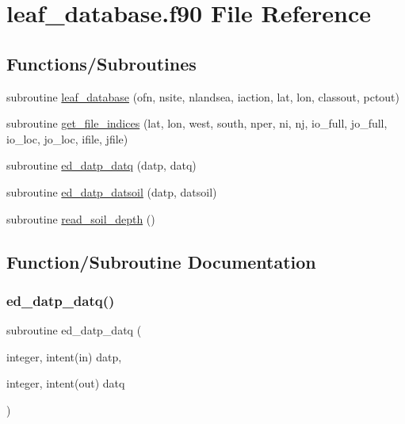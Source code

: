 \hypertarget{leaf__database_8f90}{}\section{leaf\+\_\+database.\+f90 File Reference}
\label{leaf__database_8f90}
\subsection*{Functions/\+Subroutines}
\begin{DoxyCompactItemize}
\item 
subroutine \hyperlink{leaf__database_8f90_a5009d489b8b1c0d281ea517731499fb9}{leaf\+\_\+database} (ofn, nsite, nlandsea, iaction, lat, lon, classout, pctout)
\item 
subroutine \hyperlink{leaf__database_8f90_ac2e497eb6b49641e4e59e1d9bee7c970}{get\+\_\+file\+\_\+indices} (lat, lon, west, south, nper, ni, nj, io\+\_\+full, jo\+\_\+full, io\+\_\+loc, jo\+\_\+loc, ifile, jfile)
\item 
subroutine \hyperlink{leaf__database_8f90_a2bc9d20bb929b6dcaf614245dc11fa28}{ed\+\_\+datp\+\_\+datq} (datp, datq)
\item 
subroutine \hyperlink{leaf__database_8f90_aec88c09dd7b546407a1a529befffc346}{ed\+\_\+datp\+\_\+datsoil} (datp, datsoil)
\item 
subroutine \hyperlink{leaf__database_8f90_aad22620a117c4d316d32f8cb3a185496}{read\+\_\+soil\+\_\+depth} ()
\end{DoxyCompactItemize}


\subsection{Function/\+Subroutine Documentation}
\mbox{\label{leaf__database_8f90_a2bc9d20bb929b6dcaf614245dc11fa28}} 
\subsubsection{\texorpdfstring{ed\+\_\+datp\+\_\+datq()}{ed\_datp\_datq()}}
{\footnotesize\ttfamily subroutine ed\+\_\+datp\+\_\+datq (\begin{DoxyParamCaption}\item[{integer, intent(in)}]{datp,  }\item[{integer, intent(out)}]{datq }\end{DoxyParamCaption})}

